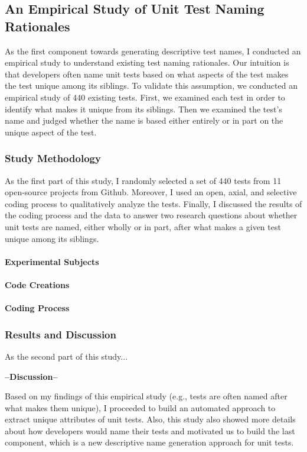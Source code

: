 \subsection{An Empirical Study of Unit Test Naming Rationales}
\label{sec:emp-study}

As the first component towards generating descriptive test names, I conducted an empirical study to understand existing test naming rationales.
%
Our intuition is that developers often name unit tests based on what aspects of the test makes the test unique among its siblings.
%
To validate this assumption, we conducted an empirical study of \num{440} existing tests.
%
First, we examined each test in order to identify what makes it unique from its siblings.
%
Then we examined the test’s name and judged whether the name is based either entirely or in part on the unique aspect of the test.


\subsubsection{Study Methodology}

As the first part of this study, I randomly selected a set of \num{440} tests from \num{11} open-source projects from Github.
%
Moreover, I used an open, axial, and selective coding process to qualitatively analyze the tests.
%
Finally, I discussed the results of the coding process and the data to answer two research questions about whether unit tests are named, either wholly or in part, after what makes a given test unique among its siblings.

\paragraph{Experimental Subjects}


\paragraph{Code Creations}


\paragraph{Coding Process}


\subsubsection{Results and Discussion}

As the second part of this study...


\textbf{--Discussion--}


Based on my findings of this empirical study (e.g., tests are often named after what makes them unique), I proceeded to build an automated approach to extract unique attributes of unit tests.
%
Also, this study also showed more details about how developers would name their tests and motivated us to build the last component, which is a new descriptive name generation approach for unit tests.